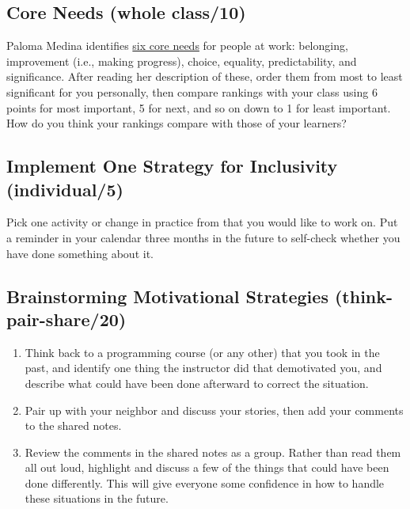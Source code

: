 \subsection{Core Needs (whole class/10)}\label{core-needs-whole-class10}

Paloma Medina identifies \href{https://www.palomamedina.com/biceps}{six core needs} for people at
work: belonging, improvement (i.e., making progress), choice,
equality, predictability, and significance. After reading her
description of these, order them from most to least significant for
you personally, then compare rankings with your class using 6 points
for most important, 5 for next, and so on down to 1 for least
important. How do you think your rankings compare with those of your
learners?

\subsection{Implement One Strategy for Inclusivity (individual/5)}\label{implement-one-strategy-for-inclusivity-individual5}

Pick one activity or change in practice from \cite{Lee2017} that you
would like to work on. Put a reminder in your calendar three months in
the future to self-check whether you have done something about it.

\subsection{Brainstorming Motivational Strategies (think-pair-share/20)}\label{brainstorming-motivational-strategies-think-pair-share20}

\begin{enumerate}
\item
  Think back to a programming course (or any other) that you took in
  the past, and identify one thing the instructor did that demotivated
  you, and describe what could have been done afterward to correct the
  situation.
\item
  Pair up with your neighbor and discuss your stories, then add your
  comments to the shared notes.
\item
  Review the comments in the shared notes as a group. Rather than read
  them all out loud, highlight and discuss a few of the things that
  could have been done differently. This will give everyone some
  confidence in how to handle these situations in the future.
\end{enumerate}

